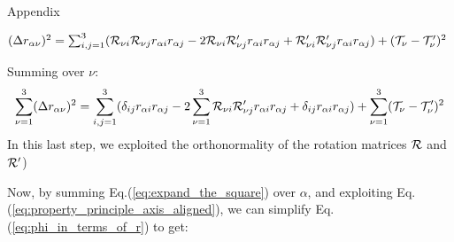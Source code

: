 \begin{appendix}{Appendix}
\begin{center}
$
(\Delta r_{\alpha \nu})^2 =
  \sum_{i,j=1}^3 (
  {\cal R}_{\nu i} {\cal R}_{\nu j} r_{\alpha i} r_{\alpha j} -
  2 {\cal R}_{\nu i} {\cal R}'_{\nu j} r_{\alpha i} r_{\alpha j} +
  {\cal R}'_{\nu i} {\cal R}'_{\nu j} r_{\alpha i} r_{\alpha j}
  )
  + ({\cal T}_\nu - {\cal T}'_\nu)^2
$
\end{center}
Summing over $\nu$:
\begin{equation}
\sum_{\nu=1}^3 (\Delta r_{\alpha \nu})^2
 = \sum_{i,j=1}^3 (
  \delta_{i j} r_{\alpha i} r_{\alpha j} -
  2 \sum_{\nu=1}^3 {\cal R}_{\nu i} {\cal R}'_{\nu j} r_{\alpha i} r_{\alpha j} +
  \delta_{i j} r_{\alpha i} r_{\alpha j}
  )
  + \sum_{\nu=1}^3 ({\cal T}_\nu - {\cal T}'_\nu)^2   \label{eq:expand_the_square}
\end{equation}
In this last step, we exploited the orthonormality of the
rotation matrices ${\cal R}$ and ${\cal R}'$)


Now, by summing Eq.(\ref{eq:expand_the_square})
over $\alpha$, and exploiting Eq.(\ref{eq:property_principle_axis_aligned}),
we can simplify Eq.(\ref{eq:phi_in_terms_of_r}) to get:



\end{appendix}
